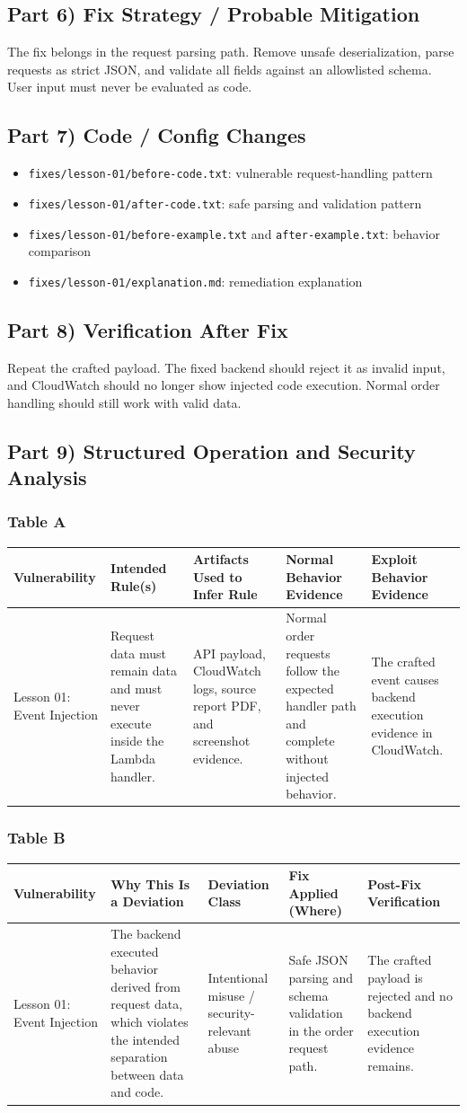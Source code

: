 \documentclass[12pt]{article}
\makeatletter
\newcommand{\analysistables}[9]{
\subsubsection*{Table A}
{\footnotesize
\begin{longtable}{@{}p{0.13\textwidth}p{0.18\textwidth}p{0.17\textwidth}p{0.16\textwidth}p{0.16\textwidth}@{}}
\toprule
Vulnerability & Intended Rule(s) & Artifacts Used to Infer Rule & Normal Behavior Evidence & Exploit Behavior Evidence \\
\midrule
#1 & #2 & #3 & #4 & #5 \\
\bottomrule
\end{longtable}
}

\subsubsection*{Table B}
{\footnotesize
\begin{longtable}{@{}p{0.13\textwidth}p{0.18\textwidth}p{0.13\textwidth}p{0.18\textwidth}p{0.16\textwidth}@{}}
\toprule
Vulnerability & Why This Is a Deviation & Deviation Class & Fix Applied (Where) & Post-Fix Verification \\
\midrule
#1 & #6 & #7 & #8 & #9 \\
\bottomrule
\end{longtable}
}
}
\makeatother
\begin{document}
\subsection*{Part 6) Fix Strategy / Probable Mitigation}
The fix belongs in the request parsing path. Remove unsafe deserialization, parse requests as strict JSON, and validate all fields against an allowlisted schema. User input must never be evaluated as code.

\subsection*{Part 7) Code / Config Changes}
\begin{itemize}
\item \texttt{fixes/lesson-01/before-code.txt}: vulnerable request-handling pattern
\item \texttt{fixes/lesson-01/after-code.txt}: safe parsing and validation pattern
\item \texttt{fixes/lesson-01/before-example.txt} and \texttt{after-example.txt}: behavior comparison
\item \texttt{fixes/lesson-01/explanation.md}: remediation explanation
\end{itemize}

\subsection*{Part 8) Verification After Fix}
Repeat the crafted payload. The fixed backend should reject it as invalid input, and CloudWatch should no longer show injected code execution. Normal order handling should still work with valid data.

\subsection*{Part 9) Structured Operation and Security Analysis}
\analysistables
{Lesson 01: Event Injection}
{Request data must remain data and must never execute inside the Lambda handler.}
{API payload, CloudWatch logs, source report PDF, and screenshot evidence.}
{Normal order requests follow the expected handler path and complete without injected behavior.}
{The crafted event causes backend execution evidence in CloudWatch.}
{The backend executed behavior derived from request data, which violates the intended separation between data and code.}
{Intentional misuse / security-relevant abuse}
{Safe JSON parsing and schema validation in the order request path.}
{The crafted payload is rejected and no backend execution evidence remains.}
\end{document}
